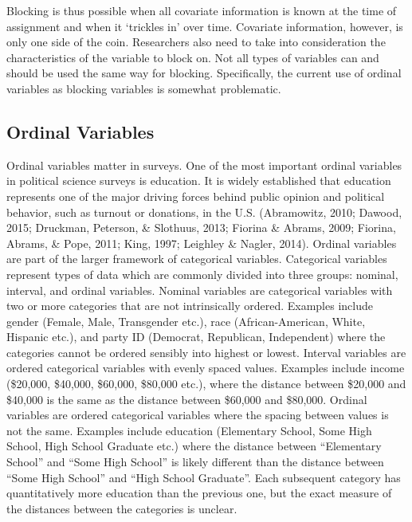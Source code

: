 \documentclass[12pt,econ]{sources/authesis}
\begin{document}
Blocking is thus possible when all covariate information is known at the time of assignment and when it `trickles in' over time. Covariate information, however, is only one side of the coin. Researchers also need to take into consideration the characteristics of the variable to block on. Not all types of variables can and should be used the same way for blocking. Specifically, the current use of ordinal variables as blocking variables is somewhat problematic.

\hypertarget{ordblock-theory-ordinal}{%
\subsection{Ordinal Variables}\label{ordblock-theory-ordinal}}

Ordinal variables matter in surveys. One of the most important ordinal variables in political science surveys is education. It is widely established that education represents one of the major driving forces behind public opinion and political behavior, such as turnout or donations, in the U.S. (Abramowitz, 2010; Dawood, 2015; Druckman, Peterson, \& Slothuus, 2013; Fiorina \& Abrams, 2009; Fiorina, Abrams, \& Pope, 2011; King, 1997; Leighley \& Nagler, 2014). Ordinal variables are part of the larger framework of categorical variables. Categorical variables represent types of data which are commonly divided into three groups: nominal, interval, and ordinal variables. Nominal variables are categorical variables with two or more categories that are not intrinsically ordered. Examples include gender (Female, Male, Transgender etc.), race (African-American, White, Hispanic etc.), and party ID (Democrat, Republican, Independent) where the categories cannot be ordered sensibly into highest or lowest. Interval variables are ordered categorical variables with evenly spaced values. Examples include income (\$20,000, \$40,000, \$60,000, \$80,000 etc.), where the distance between \$20,000 and \$40,000 is the same as the distance between \$60,000 and \$80,000. Ordinal variables are ordered categorical variables where the spacing between values is not the same. Examples include education (Elementary School, Some High School, High School Graduate etc.) where the distance between ``Elementary School'' and ``Some High School'' is likely different than the distance between ``Some High School'' and ``High School Graduate''. Each subsequent category has quantitatively more education than the previous one, but the exact measure of the distances between the categories is unclear.
\end{document}
